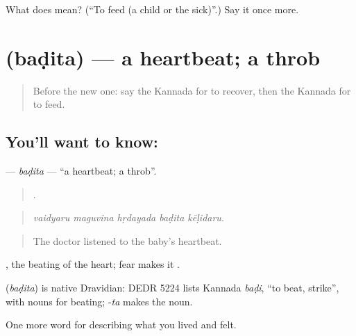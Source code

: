 \begin{tcolorbox}[breakable,colback=teal!4,colframe=teal!35!black,title={Before you move on}]
What does  mean? (\textquotedblleft{}To feed (a child or the sick)\textquotedblright{}.) Say it once more.
\end{tcolorbox}
\section[\texorpdfstring{\kn{ಬಡಿತ} (baḍita)}{ಬಡಿತ (baḍita)}]{ (baḍita) — a heartbeat; a throb}

\label{lesson:KA-C513-badita}



\begin{quote}
Before the new one: say the Kannada for to recover, then the Kannada for to feed.
\end{quote}

\subsection*{You'll want to know: }
\textbf{} — \emph{baḍita} — \textquotedblleft{}a heartbeat; a throb\textquotedblright{}.

\begin{quote}
    .
\end{quote}

\begin{quote}
\emph{vaidyaru maguvina hṛdayada baḍita kēḷidaru.}
\end{quote}

\begin{quote}
The doctor listened to the baby's heartbeat.
\end{quote}

 , the beating of the heart; fear makes it .

\begin{cousinweb}
\textbf{} (\emph{baḍita}) is native Dravidian: DEDR 5224 lists Kannada \emph{baḍi}, \textquotedblleft{}to beat, strike\textquotedblright{}, with nouns for beating; -\emph{ta} makes the noun.
\end{cousinweb}

\begin{grammarlens}[title={What you've built}]
One more word for describing what you lived and felt.
\end{grammarlens}

